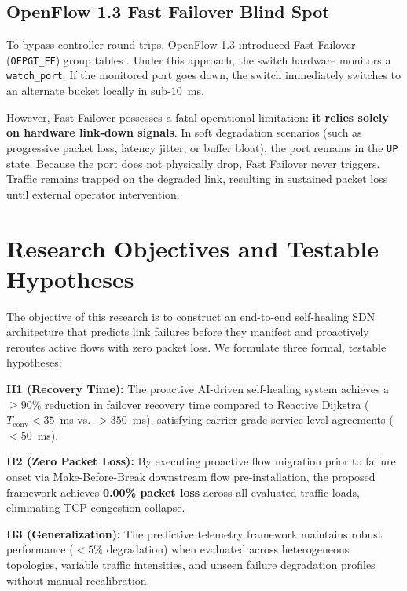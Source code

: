 \documentclass[11pt,a4paper]{report}
\begin{document}
\subsection{OpenFlow 1.3 Fast Failover Blind Spot}
To bypass controller round-trips, OpenFlow 1.3 introduced Fast Failover (\texttt{OFPGT\_FF}) group tables \cite{openflow13spec}. Under this approach, the switch hardware monitors a \texttt{watch\_port}. If the monitored port goes down, the switch immediately switches to an alternate bucket locally in sub-$10$~ms.

However, Fast Failover possesses a fatal operational limitation: \textbf{it relies solely on hardware link-down signals}. In soft degradation scenarios (such as progressive packet loss, latency jitter, or buffer bloat), the port remains in the \texttt{UP} state. Because the port does not physically drop, Fast Failover never triggers. Traffic remains trapped on the degraded link, resulting in sustained packet loss until external operator intervention.

\section{Research Objectives and Testable Hypotheses}
The objective of this research is to construct an end-to-end self-healing SDN architecture that predicts link failures before they manifest and proactively reroutes active flows with zero packet loss. We formulate three formal, testable hypotheses:

\vspace{0.25cm}
\noindent \textbf{H1 (Recovery Time):} The proactive AI-driven self-healing system achieves a $\ge 90\%$ reduction in failover recovery time compared to Reactive Dijkstra ($T_{\text{conv}} < 35$~ms vs.\ $> 350$~ms), satisfying carrier-grade service level agreements ($< 50$~ms).

\vspace{0.35cm}
\noindent \textbf{H2 (Zero Packet Loss):} By executing proactive flow migration prior to failure onset via Make-Before-Break downstream flow pre-installation, the proposed framework achieves \textbf{0.00\% packet loss} across all evaluated traffic loads, eliminating TCP congestion collapse.

\vspace{0.35cm}
\noindent \textbf{H3 (Generalization):} The predictive telemetry framework maintains robust performance ($< 5\%$ degradation) when evaluated across heterogeneous topologies, variable traffic intensities, and unseen failure degradation profiles without manual recalibration.
\end{document}
